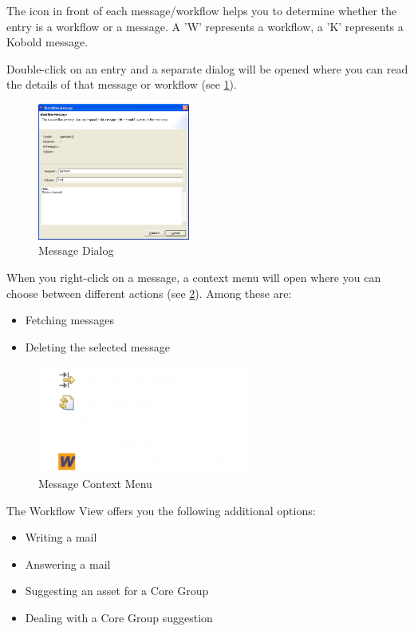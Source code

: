 The icon in front of each message/workflow helps you to determine whether the entry is a 
workflow or a message. A 'W' represents a workflow, a 'K' represents a Kobold message.\par

Double-click on an entry and a 
separate dialog will be opened where you can read the details of that message or
workflow (see \ref{workflowdialog}).

\begin{figure}[h!]
\begin{center}
\includegraphics[width=5cm]{writemail.png}
   \caption{Message Dialog}
\label{workflowdialog}
\end{center}
\end{figure}\par

When you right-click on a message, a context menu will open where you can choose 
between different actions (see \ref{workflowkontext}). Among these are:

\begin{itemize}
	\item Fetching messages
	\item Deleting the selected message
\end{itemize}

\begin{figure}[h!]
\begin{center}
\includegraphics[width=7cm]{workflowkontext.png}
   \caption{Message Context Menu}
\label{workflowkontext}
\end{center}
\end{figure}\par

The Workflow View offers you the following additional options:
\begin{itemize}
	\item Writing a mail
	\item Answering a mail
	\item Suggesting an asset for a Core Group
	\item Dealing with a Core Group suggestion
\end{itemize}


